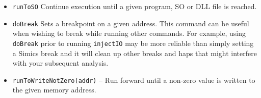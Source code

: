 \documentclass[titlepage]{article}
\begin{document}
\begin{itemize}
\item {\tt runToSO} Continue execution until a given program, SO or DLL file is reached.

\item {\tt doBreak} Sets a breakpoint on a given address.  This command can be useful when wishing to break while running other commands.  For example,
using {\tt doBreak} prior to running {\tt injectIO} may be more reliable than simply setting a Simics break and it will clean up other breaks and haps that 
might interfere with your subsequent analysis.

\item {\tt runToWriteNotZero(addr)} – Run forward until a non-zero value is written to the given memory address.


\end{itemize}
\end{document}
